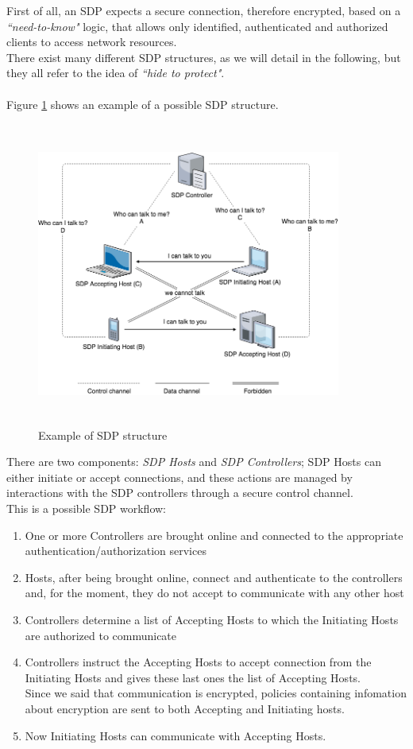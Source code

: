 \documentclass[12pt]{report}
\begin{document}
{{First of all, an SDP expects a secure connection, therefore encrypted, based on a \emph{``need-to-know"} logic, that allows only identified, authenticated and authorized clients to access network resources.\\
There exist many different SDP structures, as we will detail in the following, but they all refer to the idea of \emph{``hide to protect"}.\\\\

Figure \ref{fig:sdpstructure} shows an example of a possible SDP structure.

\begin{figure}[H]
\includegraphics[width=10cm,height=10cm,keepaspectratio]{sdp_structure1}
\centering
\caption{Example of  SDP structure}
\label{fig:sdpstructure}
\end{figure}

There are two components: \emph{SDP Hosts} and \emph{SDP Controllers}; SDP Hosts can either initiate or accept connections, and these actions are managed by interactions with the SDP controllers through a secure control channel.\\
This is a possible SDP workflow:

\begin{enumerate}
\item One or more Controllers are brought online and connected to the appropriate authentication/authorization services
\item Hosts, after being brought online, connect and authenticate to the controllers and, for the moment, they do not accept to communicate with any other host
\item Controllers determine a list of Accepting Hosts to which the Initiating Hosts are authorized to communicate
\item Controllers instruct the Accepting Hosts to accept connection from the Initiating Hosts and gives these last ones the list of Accepting Hosts.\\
Since we said that communication is encrypted, policies containing infomation about encryption are sent to both Accepting and Initiating hosts.
\item Now Initiating Hosts can communicate with Accepting Hosts.\\
\end{enumerate}

}}
\end{document}
